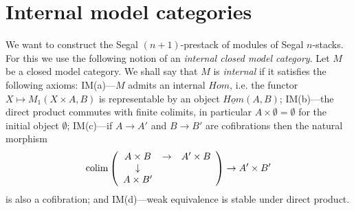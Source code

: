 %

\clearpage
\section{Internal model categories}
\label{cmipage}


We want to construct the Segal $(n+1)$-prestack of modules of Segal
$n$-stacks. For this we use the following notion of an {\em internal closed
model category}. Let $M$ be a closed model category. We shall say that $M$ is
{\em internal} if it satisfies the following axioms:
\newline
IM(a)---$M$ admits an internal $Hom$, i.e. the functor $X\mapsto M_1(X\times A,
B)$ is representable by an object $\underline{Hom} (A,B)$;
\newline
IM(b)---the direct product commutes with finite colimits, in particular
$A\times \emptyset = \emptyset$ for the initial object $\emptyset$;
\newline
IM(c)---if $A\rightarrow A'$ and $B\rightarrow B'$ are cofibrations then the
natural morphism
$$
{\rm colim} \left(
\begin{array}{ccc}
A\times B & \rightarrow & A'\times B \\
\downarrow &&  \\
A\times B' & &
\end{array}
\right) \rightarrow A'\times B'
$$
is also a cofibration; and
\newline
IM(d)---weak equivalence is stable under direct product.

